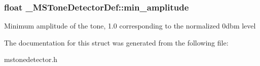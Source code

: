 \subsubsection[{min\_\-amplitude}]{\setlength{\rightskip}{0pt plus 5cm}float {\bf \_\-MSToneDetectorDef::min\_\-amplitude}}\label{struct__MSToneDetectorDef_adf697463ecf756228d4774f7610abff0}
Minimum amplitude of the tone, 1.0 corresponding to the normalized 0dbm level 

The documentation for this struct was generated from the following file:\begin{DoxyCompactItemize}
\item 
mstonedetector.h\end{DoxyCompactItemize}
